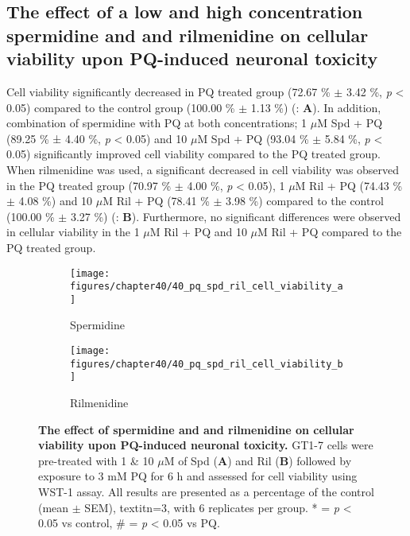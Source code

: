 \subsection{The effect of a low and high concentration spermidine and and rilmenidine on cellular viability upon PQ-induced neuronal toxicity} 
Cell viability significantly decreased in PQ treated group (72.67 \% $\pm$ 3.42 \%, \textit{p} < 0.05) compared to the control group (100.00 \% $\pm$ 1.13 \%) (: \textbf{A}). In addition, combination of spermidine with PQ at both concentrations; 1 $\mu$M Spd + PQ (89.25 \% ± 4.40 \%, \textit{p} < 0.05) and 10 $\mu$M Spd + PQ (93.04 \% $\pm$ 5.84 \%, \textit{p} < 0.05) significantly improved cell viability compared to the PQ treated group. When rilmenidine was used, a significant decreased in cell viability was observed in the PQ treated group (70.97 \% $\pm$ 4.00 \%, \textit{p} < 0.05), 1 $\mu$M Ril + PQ (74.43 \% $\pm$ 4.08 \%) and 10 $\mu$M Ril + PQ (78.41 \% $\pm$ 3.98 \%) compared to the control (100.00 \% $\pm$ 3.27 \%) (: \textbf{B}). Furthermore, no significant differences were observed in cellular viability in the 1 $\mu$M Ril + PQ and 10 $\mu$M Ril + PQ compared to the PQ treated group.

\begin{figure}[!htbp]
  \center
  \begin{subfigure}[b]{0.495\linewidth}
    \texttt{[image: figures/chapter40/40\_pq\_spd\_ril\_cell\_viability\_a]}
    \caption{Spermidine}
  \end{subfigure}
  \begin{subfigure}[b]{0.495\linewidth}
    \texttt{[image: figures/chapter40/40\_pq\_spd\_ril\_cell\_viability\_b]}
    \caption{Rilmenidine}
  \end{subfigure}
  \caption[The effect of spermidine and and rilmenidine on cellular viability upon PQ-induced neuronal toxicity]{\textbf{The effect of spermidine and and rilmenidine on cellular viability upon PQ-induced neuronal toxicity.} GT1-7 cells were pre-treated with 1 \& 10 $\mu$M of Spd (\textbf{A}) and Ril (\textbf{B}) followed by exposure to 3 mM PQ for 6 h and assessed for cell viability using WST-1 assay. All results are presented as a percentage of the control (mean $\pm$ SEM), textit{n}=3, with 6 replicates per group. * = \textit{p} < 0.05 vs control, \# = \textit{p} < 0.05 vs PQ.}
  \label{fig:40_pq_spd_ril_cell_viability_a}
\end{figure}

